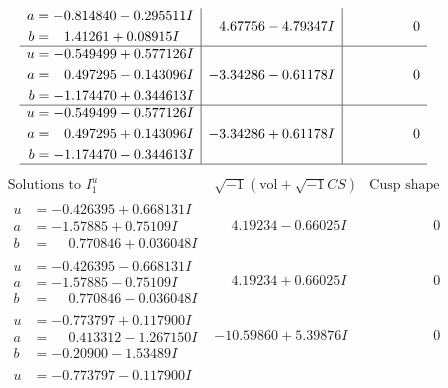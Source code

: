 \documentclass[1p]{elsarticle_modified}
\theoremstyle{definition}
\newcommand{\I}{\sqrt{-1}}
\begin{document}
$$\begin{array}{c|c|c}
\begin{aligned}
a &= -0.814840 - 0.295511 I \\
b &= \phantom{-}1.41261 + 0.08915 I\end{aligned}
 & \phantom{-}4.67756 - 4.79347 I & \phantom{-0.000000 } 0 \\ \hline\begin{aligned}
u &= -0.549499 + 0.577126 I \\
a &= \phantom{-}0.497295 - 0.143096 I \\
b &= -1.174470 + 0.344613 I\end{aligned}
 & -3.34286 - 0.61178 I & \phantom{-0.000000 } 0 \\ \hline\begin{aligned}
u &= -0.549499 - 0.577126 I \\
a &= \phantom{-}0.497295 + 0.143096 I \\
b &= -1.174470 - 0.344613 I\end{aligned}
 & -3.34286 + 0.61178 I & \phantom{-0.000000 } 0\\
 \hline 
 \end{array}$$\newpage$$\begin{array}{c|c|c}  
\text{Solutions to }I^u_{1}& \I (\text{vol} + \sqrt{-1}CS) & \text{Cusp shape}\\
 \hline 
\begin{aligned}
u &= -0.426395 + 0.668131 I \\
a &= -1.57885 + 0.75109 I \\
b &= \phantom{-}0.770846 + 0.036048 I\end{aligned}
 & \phantom{-}4.19234 - 0.66025 I & \phantom{-0.000000 } 0 \\ \hline\begin{aligned}
u &= -0.426395 - 0.668131 I \\
a &= -1.57885 - 0.75109 I \\
b &= \phantom{-}0.770846 - 0.036048 I\end{aligned}
 & \phantom{-}4.19234 + 0.66025 I & \phantom{-0.000000 } 0 \\ \hline\begin{aligned}
u &= -0.773797 + 0.117900 I \\
a &= \phantom{-}0.413312 - 1.267150 I \\
b &= -0.20900 - 1.53489 I\end{aligned}
 & -10.59860 + 5.39876 I & \phantom{-0.000000 } 0 \\ \hline\begin{aligned}
u &= -0.773797 - 0.117900 I \\

\end{aligned}
\end{array}$$
\end{document}
